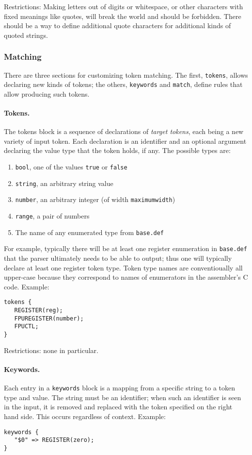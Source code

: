 Restrictions:
Making letters out of digits or whitespace, or other characters with
fixed meanings like quotes, will break the world and should be
forbidden.
There should be a way to define additional quote characters for
additional kinds of quoted strings.

\subsubsection{Matching}

There are three sections for customizing token matching.
The first, \texttt{tokens}, allows declaring new kinds of tokens;
the others, \texttt{keywords} and \texttt{match}, define rules that
allow producing such tokens.

\paragraph{Tokens.}
The tokens block is a sequence of declarations of \emph{target
tokens}, each being a new variety of input token.
Each declaration is an identifier and an optional argument declaring the value
type that the token holds, if any.
The possible types are:
\begin{enumerate}
\item \texttt{bool}, one of the values \texttt{true} or \texttt{false}
\item \texttt{string}, an arbitrary string value
\item \texttt{number}, an arbitrary integer (of width \texttt{maximumwidth})
\item \texttt{range}, a pair of numbers
\item The name of any enumerated type from \texttt{base.def}
\end{enumerate}
For example, typically there will be at least one register enumeration
in \texttt{base.def} that the parser ultimately needs to be able to
output; thus one will typically declare at least one register token
type.
Token type names are conventioually all upper-case because they
correspond to names of enumerators in the assembler's C code.
Example:
\begin{verbatim}
tokens {
   REGISTER(reg);
   FPUREGISTER(number);
   FPUCTL;
}
\end{verbatim}

Restrictions: none in particular.

\paragraph{Keywords.}
Each entry in a \texttt{keywords} block is a mapping from a specific
string to a token type and value.
The string must be an identifier; when such an identifier is seen in
the input, it is removed and replaced with the token specified on the
right hand side.
This occurs regardless of context.
Example:
\begin{verbatim}
keywords {
   "$0" => REGISTER(zero);
}
\end{verbatim}

